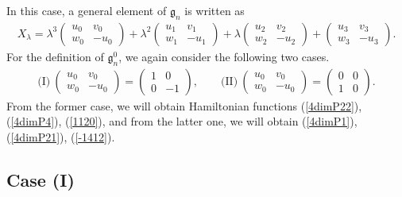 \documentclass[10pt,a4paper]{amsart}
\numberwithin{equation}{section}
\begin{document}
In this case, a general element of $\mathfrak{g}_n$ is written as
\begin{gather*}
X_\lambda = \lambda ^3 \left(
\begin{matrix}
u_0 & v_0 \\
w_0 & -u_0
\end{matrix}
\right) + \lambda^2 \left(
\begin{matrix}
u_1 & v_1 \\
w_1 & -u_1
\end{matrix}
\right) + \lambda \left(
\begin{matrix}
u_2 & v_2 \\
w_2 & -u_2
\end{matrix}
\right) + \left(
\begin{matrix}
u_3 & v_3 \\
w_3 & -u_3
\end{matrix}
\right).
\end{gather*}
For the def\/inition of $\mathfrak{g}^0_n$, we again consider the following two cases.
\begin{gather*}
\text{(I)}\ \left(
\begin{matrix}
u_0 & v_0 \\
w_0 & -u_0
\end{matrix}
\right) = \left(
\begin{matrix}
1 & 0 \\
0 & -1
\end{matrix}
\right), \qquad \text{(II)}\ \left(
\begin{matrix}
u_0 & v_0 \\
w_0 & -u_0
\end{matrix}
\right) = \left(
\begin{matrix}
0 & 0 \\
1 & 0
\end{matrix}
\right).
\end{gather*}
From the former case, we will obtain Hamiltonian functions (\ref{4dimP22}), (\ref{4dimP4}), (\ref{1120}), and from the latter one, we will obtain (\ref{4dimP1}), (\ref{4dimP21}), (\ref{-1412}).

\subsection{Case (I)}\label{section4.1}
\end{document}
